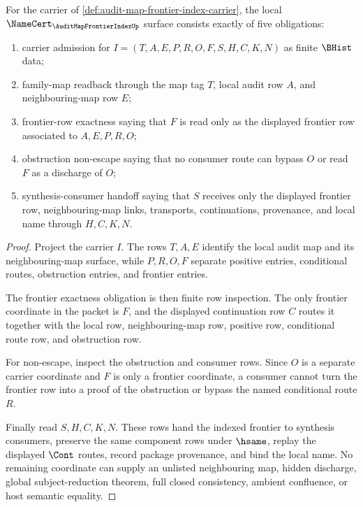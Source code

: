 \begin{theorem}
\label{thm:audit-map-frontier-index-namecert-obligations}
For the carrier of \autoref{def:audit-map-frontier-index-carrier}, the local $\NameCert_{\AuditMapFrontierIndexUp}$ surface consists exactly of five obligations:
\begin{enumerate}
\item carrier admission for $I=(T,A,E,P,R,O,F,S,H,C,K,N)$ as finite $\BHist$ data;
\item family-map readback through the map tag $T$, local audit row $A$, and neighbouring-map row $E$;
\item frontier-row exactness saying that $F$ is read only as the displayed frontier row associated to $A,E,P,R,O$;
\item obstruction non-escape saying that no consumer route can bypass $O$ or read $F$ as a discharge of $O$;
\item synthesis-consumer handoff saying that $S$ receives only the displayed frontier row, neighbouring-map links, transports, continuations, provenance, and local name through $H,C,K,N$.
\end{enumerate}
\end{theorem}
\begin{proof}
Project the carrier $I$. The rows $T,A,E$ identify the local audit map and its neighbouring-map surface, while $P,R,O,F$ separate positive entries, conditional routes, obstruction entries, and frontier entries.

The frontier exactness obligation is then finite row inspection. The only frontier coordinate in the packet is $F$, and the displayed continuation row $C$ routes it together with the local row, neighbouring-map row, positive row, conditional route row, and obstruction row.

For non-escape, inspect the obstruction and consumer rows. Since $O$ is a separate carrier coordinate and $F$ is only a frontier coordinate, a consumer cannot turn the frontier row into a proof of the obstruction or bypass the named conditional route $R$.

Finally read $S,H,C,K,N$. These rows hand the indexed frontier to synthesis consumers, preserve the same component rows under $\hsame$, replay the displayed $\Cont$ routes, record package provenance, and bind the local name. No remaining coordinate can supply an unlisted neighbouring map, hidden discharge, global subject-reduction theorem, full closed consistency, ambient confluence, or host semantic equality.
\end{proof}

